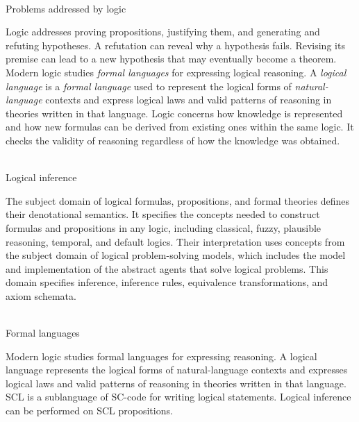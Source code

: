 \begin{frame}{\\Problems addressed by logic}
\topline
\justifying
\vspace{10mm}


        Logic addresses proving propositions, justifying them, and generating and refuting hypotheses. A refutation can reveal why a hypothesis fails. Revising its premise can lead to a new hypothesis that may eventually become a theorem.
        Modern logic studies \textit{formal languages} for expressing logical reasoning. A \textit{logical language} is a \textit{formal language} used to represent the logical forms of \textit{natural-language} contexts and express logical laws and valid patterns of reasoning in theories written in that language. Logic concerns how knowledge is represented and how new formulas can be derived from existing ones within the same logic. It checks the validity of reasoning regardless of how the knowledge was obtained.
\end{frame}

\begin{frame}{\\Logical inference}
\topline
\justifying
\vspace{10mm}


        The subject domain of logical formulas, propositions, and formal theories defines their denotational semantics. It specifies the concepts needed to construct formulas and propositions in any logic, including classical, fuzzy, plausible reasoning, temporal, and default logics. Their interpretation uses concepts from the subject domain of logical problem-solving models, which includes the model and implementation of the abstract agents that solve logical problems. This domain specifies inference, inference rules, equivalence transformations, and axiom schemata.
\end{frame}

\begin{frame}{\\Formal languages}
\topline
\justifying
\vspace{10mm}

        Modern logic studies formal languages for expressing reasoning. A logical language represents the logical forms of natural-language contexts and expresses logical laws and valid patterns of reasoning in theories written in that language.
        \\SCL is a sublanguage of SC-code for writing logical statements. Logical inference can be performed on SCL propositions.
\end{frame}

